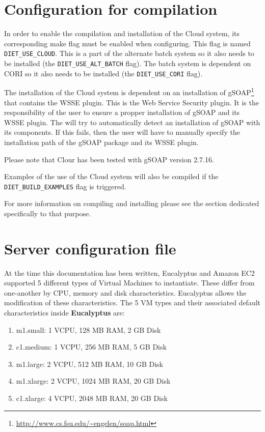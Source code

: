 \section{Configuration for compilation}

In order to enable the compilation and installation of the \diet Cloud system, its corresponding make flag
must be enabled when configuring. This flag is named \verb!DIET_USE_CLOUD!. This is a part of
the alternate batch system so it also needs to be installed (the \verb!DIET_USE_ALT_BATCH! flag). The \diet
batch system is dependent on CORI so it also needs to be installed (the \verb!DIET_USE_CORI! flag).

The installation of the Cloud system is dependent on an installation of gSOAP\footnote{\url{http://www.cs.fsu.edu/~engelen/soap.html}}
that contains the WSSE plugin.
This is the Web Service Security plugin. It is the responsibility of the \diet user to ensure a propper
installation of gSOAP and its WSSE plugin. The will try to automatically detect an installation of gSOAP
with its components. If this fails, then the \diet user will have to manually specify the installation
path of the gSOAP package and its WSSE plugin.

Please note that \diet Clour has been tested with gSOAP version 2.7.16.

Examples of the use of the \diet Cloud system will also be compiled if the \verb!DIET_BUILD_EXAMPLES! flag
is triggered.

For more information on compiling and installing \diet please see the section dedicated specifically to that purpose.


\section{Server configuration file}

At the time this documentation has been written, Eucalyptus and Amazon
EC2 supported 5 different types of Virtual Machines to
instantiate. These differ from one-another by CPU, memory and disk
characteristics. Eucalyptus allows the modification of these
characteristics. The 5 VM types and their associated default
characteristics inside \textbf{Eucalyptus} are:
\begin{enumerate}
\item{m1.small}: 1 VCPU, 128 MB RAM, 2 GB Disk
\item{c1.medium}: 1 VCPU, 256 MB RAM, 5 GB Disk 
\item{m1.large}: 2 VCPU, 512 MB RAM, 10 GB Disk 
\item{m1.xlarge}: 2 VCPU, 1024 MB RAM, 20 GB Disk 
\item{c1.xlarge}: 4 VCPU, 2048 MB RAM, 20 GB Disk 
\end{enumerate}

